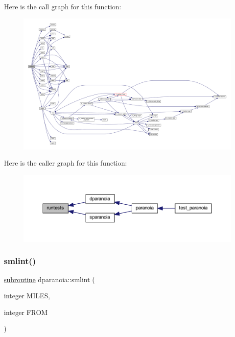 Here is the call graph for this function\+:
\nopagebreak
\begin{figure}[H]
\begin{center}
\leavevmode
\includegraphics[width=350pt]{dparanoia_8f90_a210778c94f0b539462736c5c6867e960_cgraph}
\end{center}
\end{figure}
Here is the caller graph for this function\+:
\nopagebreak
\begin{figure}[H]
\begin{center}
\leavevmode
\includegraphics[width=350pt]{dparanoia_8f90_a210778c94f0b539462736c5c6867e960_icgraph}
\end{center}
\end{figure}
\mbox{\label{dparanoia_8f90_a65decbca56a5900d39f6954e07965116}} 
\subsubsection{\texorpdfstring{smlint()}{smlint()}}
{\footnotesize\ttfamily \hyperlink{M__stopwatch_83_8txt_acfbcff50169d691ff02d4a123ed70482}{subroutine} dparanoia\+::smlint (\begin{DoxyParamCaption}\item[{integer}]{M\+I\+L\+ES,  }\item[{integer}]{F\+R\+OM }\end{DoxyParamCaption})}



